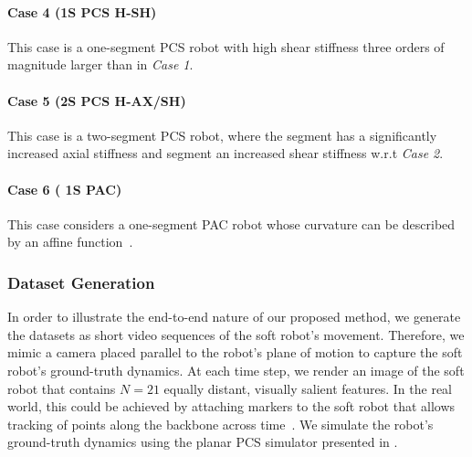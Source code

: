 \paragraph{Case 4 (1S PCS H-SH)}
This case is a one-segment \gls{PCS} robot with high shear stiffness three orders of magnitude larger than in \emph{Case 1}.

\paragraph{Case 5 (2S PCS H-AX/SH)}
This case is a two-segment \gls{PCS} robot, where the  segment has a significantly increased axial stiffness and  segment an increased shear stiffness w.r.t \emph{Case 2}.

\paragraph{Case 6 ( 1S PAC)} This case considers a one-segment \gls{PAC} robot whose curvature can be described by an affine function~\cite{stella2023piecewise}.



\subsubsection{Dataset Generation}
In order to illustrate the end-to-end nature of our proposed method, we generate the datasets as short video sequences of the soft robot's movement. 
Therefore, we mimic a camera placed parallel to the robot's plane of motion to capture the soft robot's ground-truth dynamics.
At each time step, we render an image of the soft robot that contains $N=21$ equally distant, visually salient features. In the real world, this could be achieved by attaching markers to the soft robot that allows tracking of points along the backbone across time~\cite{stella2022experimental}.
We simulate the robot's ground-truth dynamics using the planar \gls{PCS} simulator presented in \cite{stolzle2024experimental}.

